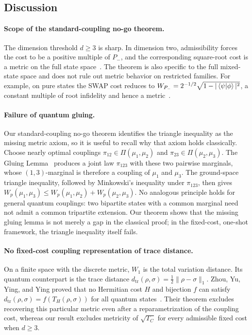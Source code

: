 \documentclass[11pt]{article}
\newcommand{\braket}[2]{\left< #1 \vphantom{#2} \middle| #2 \vphantom{#1} \right>} %
\begin{document}
\subsection{Discussion}

\paragraph{Scope of the standard-coupling no-go theorem.}
The dimension threshold $d\geq3$ is sharp.  In dimension two, admissibility
forces the cost to be a positive multiple of $P_-$, and the corresponding
square-root cost is a metric on the full state space~\cite{FECZ22,CEFZ23}.
The theorem is also specific to the full mixed-state space and does not rule
out metric behavior on restricted families.  For example, on pure states the
SWAP cost reduces to
$W_{P_-}=2^{-1/2}\sqrt{1-|\braket{\psi}{\phi}|^2}$, a constant multiple of
root infidelity and hence a metric~\cite[Proposition~1]{FECZ22}.

\paragraph{Failure of quantum gluing.}
Our standard-coupling no-go theorem identifies the triangle inequality as
the missing metric axiom, so it is useful to recall why that axiom holds
classically.  Choose nearly optimal couplings
$\pi_{12}\in\Pi(\mu_1,\mu_2)$ and $\pi_{23}\in\Pi(\mu_2,\mu_3)$.  The Gluing
Lemma~\cite[p.~23]{Vil09} produces a joint law $\pi_{123}$ with these
two pairwise marginals, whose $(1,3)$-marginal is therefore a coupling of
$\mu_1$ and $\mu_3$.  The ground-space triangle inequality, followed by
Minkowski's inequality under $\pi_{123}$, then gives
$W_p(\mu_1,\mu_3)\leq W_p(\mu_1,\mu_2)+W_p(\mu_2,\mu_3)$.  No analogous
principle holds for general quantum couplings: two bipartite states with a
common marginal need not admit a common tripartite extension.  Our theorem
shows that the missing gluing lemma is not merely a gap in the classical
proof; in the fixed-cost, one-shot framework, the triangle inequality
itself fails.

\paragraph{No fixed-cost coupling representation of trace distance.}
On a finite space with the discrete metric, $W_1$ is the total variation
distance.  Its quantum counterpart is the trace distance
$d_{\mathrm{tr}}(\rho,\sigma)=\frac12\|\rho-\sigma\|_1$.
Zhou, Yu, Ying, and Ying proved that no
Hermitian cost $H$ and bijection $f$ can satisfy
$d_{\mathrm{tr}}(\rho,\sigma)=f(T_H(\rho,\sigma))$ for all quantum
states~\cite[Theorem~7]{ZYYY22}.  Their theorem excludes recovering this
particular metric even after a reparametrization of the coupling cost,
whereas our result excludes metricity of $\sqrt{T_C}$ for every admissible
fixed cost when $d\geq3$.
\end{document}
